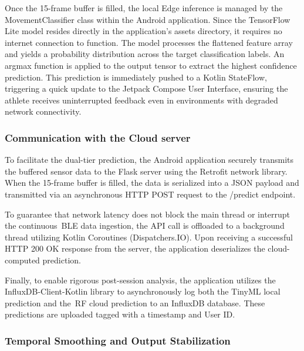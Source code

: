 Once the 15-frame buffer is filled, the local Edge inference is managed by the MovementClassifier class within the Android application. Since the TensorFlow Lite model resides directly in the application's assets directory, it 
requires no internet connection to function. The model processes the flattened feature array and yields a probability distribution across the target classification labels. An argmax function is applied to the output tensor to extract the 
highest confidence prediction. This prediction is immediately pushed to a Kotlin StateFlow, triggering a quick update to the Jetpack Compose User Interface, ensuring the athlete receives uninterrupted feedback even in environments with 
degraded network connectivity.



\subsubsection{Communication with the Cloud server}
\label{sssec:com_ml_server}

To facilitate the dual-tier prediction, the Android application securely transmits the buffered sensor data to the Flask server using the Retrofit network library. When the 15-frame buffer is filled, the data is serialized into a JSON payload and transmitted via 
an asynchronous HTTP POST request to the /predict endpoint.

To guarantee that network latency does not block the main thread or interrupt the continuous~\gls{BLE} data ingestion, the API call is offloaded to a background thread utilizing Kotlin Coroutines (Dispatchers.IO). Upon receiving a successful HTTP 200 OK 
response from the server, the application deserializes the cloud-computed prediction.

Finally, to enable rigorous post-session analysis, the application utilizes the InfluxDB-Client-Kotlin library to asynchronously log both the Tiny\gls{ML} local prediction and the~\gls{RF} cloud prediction to an InfluxDB database. These predictions are uploaded
tagged with a timestamp and User ID. %

\subsubsection{Temporal Smoothing and Output Stabilization}
\label{sssec:temporal_smoothing}

